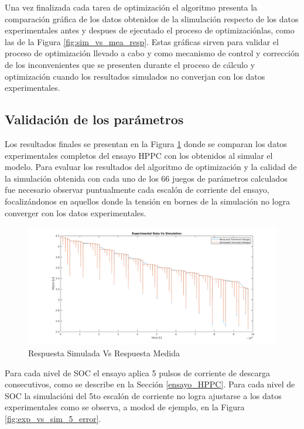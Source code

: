 \documentclass[10pt, a4paper]{report}
\begin{document}
Una vez finalizada cada tarea de optimización el algoritmo presenta la 
comparación gráfica de los datos obtenidos de la slimulación respecto de los 
datos experimentales antes y despues de ejecutado el proceso de optimizaciónlas, 
como las de la Figura \ref{fig:sim_vs_mea_resp}. Estas gráficas sirven para
validar el proceso de optimización llevado a cabo y como mecanismo de control y
corrección de los inconvenientes que se presenten durante el proceso de cálculo
y optimización cuando los resultados simulados no converjan con los datos
experimentales.

\subsection{Validación de los parámetros}\label{val_param_modelo}

Los resultados finales se presentan en la Figura \ref{fig:exp_vs_sim} donde se
comparan los datos experimentales completos del ensayo \acrshort{HPPC} con los
obtenidos al simular el modelo. Para evaluar los resultados del algoritmo de 
optimización y la calidad de la simulación obtenida con cada uno de los 66 
juegos de parámetros calculados fue necesario observar puntualmente cada
escal\'on de corriente del ensayo, focalizándonos en aquellos donde la tensión 
en bornes de la simulación no logra converger con los datos experimentales.

\begin{figure}[h!]
	\begin{center}
		\includegraphics[width=1\textwidth]{Vterm_exp_vs_sim.png}
		\caption{Respuesta Simulada Vs Respuesta Medida}
		\label{fig:exp_vs_sim}
	\end{center}
\end{figure}

Para cada nivel de \acrshort{SOC} el ensayo aplica 5 pulsos de corriente de
descarga consecutivos, como se describe en la Sección \ref{ensayo_HPPC}. Para
cada nivel de \acrshort{SOC} la simulacióni del 5to escalón de corriente no
logra ajustarse a los datos experimentales como se observa, a modod de ejemplo,
en la Figura \ref{fig:exp_vs_sim_5_error}.
\end{document}

